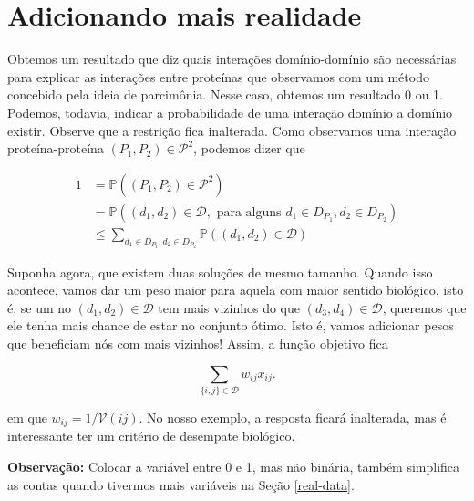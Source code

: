 \documentclass[11pt]{article}
\begin{document}
\section{Adicionando mais realidade}
\label{reality}

Obtemos um resultado que diz quais interações domínio-domínio são
necessárias para explicar as interações entre proteínas que observamos
com um método concebido pela ideia de parcimônia. Nesse caso, obtemos um
resultado 0 ou 1. Podemos, todavia, indicar a probabilidade de uma
interação domínio a domínio existir. Observe que a restrição fica
inalterada. Como observamos uma interação proteína-proteína
\((P_1, P_2) \in \mathcal{P}^2\), podemos dizer que

\begin{equation*}
    \begin{split}
        1 &= \mathbb{P}\left((P_1, P_2) \in \mathcal{P}^2\right) \\
        &= \mathbb{P}\left((d_1, d_2) \in \mathcal{D}, \text{ para alguns } d_1 \in D_{P_1}, d_2 \in D_{P_2}\right) \\
        &\le \sum_{d_1 \in D_{P_1}, d_2 \in D_{P_2}} \mathbb{P}\left((d_1, d_2) \in \mathcal{D}\right)
    \end{split}
\end{equation*}

Suponha agora, que existem duas soluções de mesmo tamanho. Quando isso
acontece, vamos dar um peso maior para aquela com maior sentido
biológico, isto é, se um no \((d_1, d_2) \in \mathcal{D}\) tem mais
vizinhos do que \((d_3, d_4) \in \mathcal{D}\), queremos que ele tenha
mais chance de estar no conjunto ótimo. Isto é, vamos adicionar pesos
que beneficiam nós com mais vizinhos! Assim, a função objetivo fica

\[\sum_{\{i,j\} \in \mathcal{D}} w_{ij}x_{ij}.\]

em que \(w_{ij} = 1/\mathcal{V}(ij)\). No nosso exemplo, a resposta
ficará inalterada, mas é interessante ter um critério de desempate
biológico.

\textbf{Observação:} Colocar a variável entre 0 e 1, mas não binária,
também simplifica as contas quando tivermos mais variáveis na
Seção \ref{real-data}.
\end{document}
